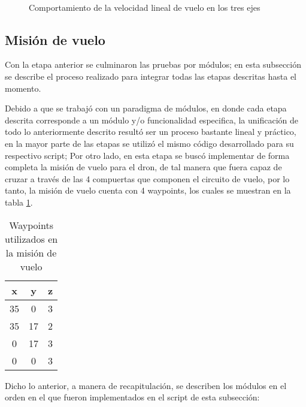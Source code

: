 \begin{figure}[ht]
    \centering
    \hfill
    \\
    \hfill

    \caption{Comportamiento de la velocidad lineal de vuelo en los tres ejes}
    \label{fig:pymav_movementv}
\end{figure}


\subsection{Misión de vuelo}

Con la etapa anterior se culminaron las pruebas por módulos; en esta subsección se describe el proceso realizado para integrar todas las etapas descritas hasta el momento.

Debido a que se trabajó con un paradigma de módulos, en donde cada etapa descrita corresponde a un módulo y/o funcionalidad especifica, la unificación de todo lo anteriormente descrito resultó ser un proceso bastante lineal y práctico, en la mayor parte de las etapas se utilizó el mismo código desarrollado para su respectivo script; Por otro lado, en esta etapa se buscó implementar de forma completa la misión de vuelo para el dron, de tal manera que fuera capaz de cruzar a través de las 4 compuertas que componen el circuito de vuelo, por lo tanto, la misión de vuelo cuenta con 4 waypoints, los cuales se muestran en la tabla \ref{tab:waypoints_mission}.

\begin{table}[ht]
    \centering
    \begin{tabular}{||c|c|c||}
        \hline
        x & y & z\\
        \hline
        35 & 0 & 3\\
        35 & 17 & 2\\
        0 & 17 & 3\\
        0 & 0 & 3\\
        \hline
    \end{tabular}
    \caption{Waypoints utilizados en la misión de vuelo}
    \label{tab:waypoints_mission}
\end{table}


Dicho lo anterior, a manera de recapitulación, se describen los módulos en el orden en el que fueron implementados en el script de esta subsección:

